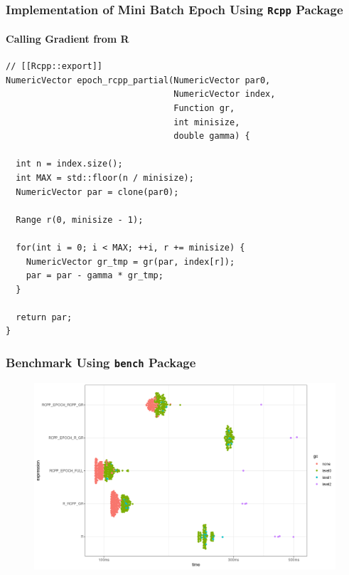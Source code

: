 \documentclass[aspectratio=169]{beamer}
\begin{document}
\begin{frame}[fragile]
    \frametitle{Implementation of Mini Batch Epoch Using \texttt{Rcpp} Package}
    \framesubtitle{Calling Gradient from R}
\begin{verbatim}
// [[Rcpp::export]]
NumericVector epoch_rcpp_partial(NumericVector par0,
                                 NumericVector index,
                                 Function gr,
                                 int minisize,
                                 double gamma) {
  
  int n = index.size();
  int MAX = std::floor(n / minisize);
  NumericVector par = clone(par0);
  
  Range r(0, minisize - 1);
  
  for(int i = 0; i < MAX; ++i, r += minisize) {
    NumericVector gr_tmp = gr(par, index[r]);
    par = par - gamma * gr_tmp;
  }
  
  return par;
}
\end{verbatim}
\end{frame}
\begin{frame}
    \frametitle{Benchmark Using \texttt{bench} Package}
    \begin{figure}
        \centering
        \includegraphics[scale = 0.4]{figure/RcppVR.png}
    \end{figure}
\end{frame}
\end{document}
